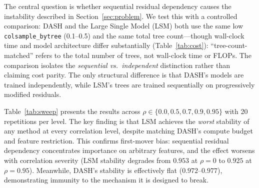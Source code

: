 \documentclass[11pt]{article}
\newcommand{\dash}{\textsc{DASH}}
\newcommand{\rhovar}{\rho}
\begin{document}
The central question is whether sequential residual dependency causes
the instability described in Section~\ref{sec:problem}. We test this
with a controlled comparison: \dash{} and the Large Single Model (LSM)
both use the same low \texttt{colsample\_bytree} (0.1--0.5) and the same
total tree count---though wall-clock time and model architecture differ
substantially (Table~\ref{tab:cost}): ``tree-count-matched'' refers to
the total number of trees, not wall-clock time or FLOPs. The comparison isolates the
\emph{sequential vs.\ independent} distinction rather than claiming
cost parity. The only structural difference is that \dash{}'s models
are trained independently, while LSM's trees are trained sequentially
on progressively modified residuals.

Table~\ref{tab:sweep} presents the results across
$\rhovar \in \{0.0, 0.5, 0.7, 0.9, 0.95\}$ with 20 repetitions per
level. The key finding is that LSM achieves the \emph{worst}
stability of any method at every correlation level, despite matching
\dash{}'s compute budget and feature restriction. This confirms
first-mover bias: sequential residual dependency concentrates
importance on arbitrary features, and the effect worsens with
correlation severity (LSM stability degrades from $0.953$ at
$\rhovar = 0$ to $0.925$ at $\rhovar = 0.95$). Meanwhile, \dash{}'s
stability is effectively flat ($0.972$--$0.977$), demonstrating
immunity to the mechanism it is designed to break.
\end{document}
